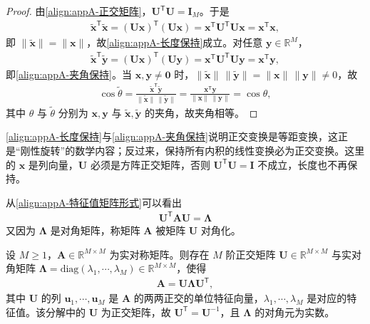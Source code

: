\documentclass[../main.tex]{subfiles}
\begin{document}
\begin{proof}
由\eqref{align:appA-正交矩阵}，$\bm{U}^{\mathsf{T}}\bm{U}=\bm{I}_{M}$。于是
\begin{align*}
 \tilde{\bm{x}}^{\mathsf{T}}\tilde{\bm{x}}=(\bm{U}\bm{x})^{\mathsf{T}}(\bm{U}\bm{x})=\bm{x}^{\mathsf{T}}\bm{U}^{\mathsf{T}}\bm{U}\bm{x}=\bm{x}^{\mathsf{T}}\bm{x},
\end{align*}
即 $\|\tilde{\bm{x}}\|=\|\bm{x}\|$，故\eqref{align:appA-长度保持}成立。对任意 $\bm{y}\in\mathbb{R}^{M}$，
\begin{align*}
 \tilde{\bm{x}}^{\mathsf{T}}\tilde{\bm{y}}=(\bm{U}\bm{x})^{\mathsf{T}}(\bm{U}\bm{y})=\bm{x}^{\mathsf{T}}\bm{U}^{\mathsf{T}}\bm{U}\bm{y}=\bm{x}^{\mathsf{T}}\bm{y},
\end{align*}
即\eqref{align:appA-夹角保持}。当 $\bm{x},\bm{y}\neq\bm{0}$ 时，$\|\tilde{\bm{x}}\|\,\|\tilde{\bm{y}}\|=\|\bm{x}\|\,\|\bm{y}\|\neq0$，故
\begin{align*}
 \cos\tilde{\theta}=\frac{\tilde{\bm{x}}^{\mathsf{T}}\tilde{\bm{y}}}{\|\tilde{\bm{x}}\|\,\|\tilde{\bm{y}}\|}
 =\frac{\bm{x}^{\mathsf{T}}\bm{y}}{\|\bm{x}\|\,\|\bm{y}\|}=\cos\theta,
\end{align*}
其中 $\theta$ 与 $\tilde{\theta}$ 分别为 $\bm{x},\bm{y}$ 与 $\tilde{\bm{x}},\tilde{\bm{y}}$ 的夹角，故夹角相等。
\end{proof}

\begin{remark}
\eqref{align:appA-长度保持}与\eqref{align:appA-夹角保持}说明正交变换是等距变换，这正是“刚性旋转”的数学内容；反过来，保持所有内积的线性变换必为正交变换。这里的 $\bm{x}$ 是列向量，$\bm{U}$ 必须是方阵正交矩阵，否则 $\bm{U}^{\mathsf{T}}\bm{U}=\bm{I}$ 不成立，长度也不再保持。
\end{remark}

从\eqref{align:appA-特征值矩阵形式}可以看出
\begin{align}
  \bm{U}^{\mathsf{T}}\bm{A}\bm{U}=\bm{\Lambda}
  \label{align:appA-对角化}
\end{align}
又因为 $\bm{\Lambda}$ 是对角矩阵，称矩阵 $\bm{A}$ 被矩阵 $\bm{U}$ 对角化。

\begin{theorem}[实对称矩阵的谱分解]\label{theorem:appA-谱分解}
设 $M\geqslant1$，$\bm{A}\in\mathbb{R}^{M\times M}$ 为实对称矩阵。则存在 $M$ 阶正交矩阵 $\bm{U}\in\mathbb{R}^{M\times M}$ 与实对角矩阵 $\bm{\Lambda}=\mathrm{diag}(\lambda_1,\cdots,\lambda_M)\in\mathbb{R}^{M\times M}$，使得
\begin{align}
  \bm{A}=\bm{U}\bm{\Lambda}\bm{U}^{\mathsf{T}},
  \label{align:appA-谱分解}
\end{align}
其中 $\bm{U}$ 的列 $\bm{u}_1,\cdots,\bm{u}_M$ 是 $\bm{A}$ 的两两正交的单位特征向量，$\lambda_1,\cdots,\lambda_M$ 是对应的特征值。该分解中的 $\bm{U}$ 为正交矩阵，故 $\bm{U}^{\mathsf{T}}=\bm{U}^{-1}$，且 $\bm{\Lambda}$ 的对角元为实数。
\end{theorem}
\end{document}
